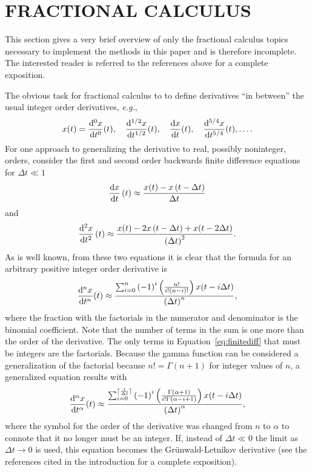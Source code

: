 \section{FRACTIONAL CALCULUS}
\label{sec:fractional}

  This section gives a very brief overview of only the fractional calculus
  topics necessary to implement the methods in this paper and is therefore
  incomplete. The interested reader is referred to the references above for a
  complete exposition.

  The obvious task for fractional calculus to to define derivatives ``in
  between'' the usual integer order derivatives, \textit{e.g.}, 
\[
x(t) = \frac{\mathrm{d}^0 x}{\mathrm{d} t^0}(t), \quad\frac{\mathrm{d}^{1/2} x}{\mathrm{d}
t^{1/2}}(t), \quad \frac{\mathrm{d} x}{\mathrm{d} t}(t),  \quad \frac{\mathrm{d}^{5/4} x}{\mathrm{d}
t^{5/4}}(t), \ldots.
\]
  For one approach to generalizing the derivative to real, possibly noninteger,
  orders, consider the first and second order backwards finite difference
  equations for $\Delta t \ll 1$
\[
 \frac{\mathrm{d} x}{\mathrm{d} t}\left(t\right) \approx \frac{x(t) - x \left(t - \Delta
 t\right)}{\Delta t}
 \]
 and
 \[
    \frac{\mathrm{d}^2 x}{\mathrm{d} t^2}\left(t\right) \approx \frac{x(t) - 2 x \left(t - \Delta
    t\right) + x(t - 2 \Delta t)}{\left( \Delta t \right)^2}.
 \]
 As is well known, from these two equations it is clear that the formula for an
 arbitrary positive integer order derivative is
 \begin{equation}
  \frac{\mathrm{d}^n x}{\mathrm{d} t^n}(t) \approx \frac{\sum_{i=0}^n \left( -1 \right)^i
  \left( \frac{n!}{i! \left( n - i \right)!} \right) x ( t - i \Delta t )}{\left( \Delta t
  \right)^n},
  \label{eq:finitediff}
 \end{equation}
 where the fraction with the factorials in the numerator and denominator is the
 binomial coefficient. Note that the number of terms in the sum is one more than
 the order of the derivative.  The only terms in Equation~\ref{eq:finitediff}
 that must be integers are the factorials. Because the gamma function can be
 considered a generalization of the factorial because $n! = \Gamma(n+1)$ for
 integer values of $n$, a generalized equation results with
 \begin{equation}
    \frac{\mathrm{d}^\alpha x}{\mathrm{d} t^\alpha}(t) \approx \frac{\sum_{i=0}^{\lceil
    \frac{t}{\Delta t} \rceil} \left( -1 \right)^i \left(
    \frac{\Gamma(\alpha+1)}{i! \Gamma\left( \alpha - i + 1\right)} \right) x ( t
    - i \Delta t )}{\left( \Delta t \right)^\alpha},
    \label{eq:gw}
 \end{equation}
 where the symbol for the order of the derivative was changed from $n$ to
 $\alpha$ to connote that it no longer must be an integer. 
 If, instead of $\Delta t \ll 0$ the limit as $\Delta t \rightarrow 0$ is used,
 this equation becomes the Gr\"unwald-Letnikov derivative (see the references
 cited in the introduction for a complete exposition). 
  
